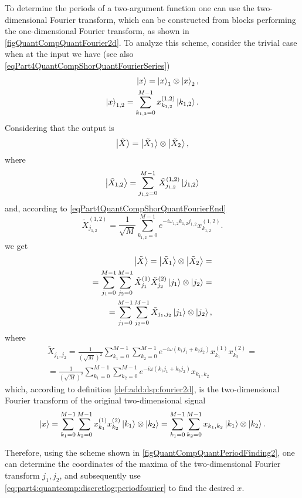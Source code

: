 To determine the periods of a two-argument function one can use
the two-dimensional Fourier transform, which can be constructed from
blocks performing the one-dimensional Fourier transform, as shown in \autoref{figQuantCompQuantFourier2d}. To analyze this
scheme, consider the trivial case when
at the input we have (see also \eqref{eqPart4QuantCompShorQuantFourierSeries})
\begin{eqnarray}
\ket{x} = \ket{x}_1 \otimes \ket{x}_2,
\nonumber \\
\ket{x}_{1,2} = \sum_{k_{1,2} = 0}^{M-1} x_{k_{1,2}}^{(1,2)} \ket{k_{1,2}}.
\nonumber
\end{eqnarray}
Considering that the output is
\[
\ket{\tilde{X}} = \ket{\tilde{X}_1} \otimes \ket{\tilde{X}_2},
\]
where
\[
\ket{\tilde{X}_{1,2}} = \sum_{j_{1,2} = 0}^{M-1} \tilde{X}_{j_{1,2}}^{(1,2)} \ket{j_{1,2}}
\]
and, according to \eqref{eqPart4QuantCompShorQuantFourierEnd}
\[
\tilde{X}_{j_{1,2}}^{(1,2)} = \frac{1}{\sqrt{M}}\sum_{k_{1,2} = 0}^{M - 1}e^{-i \omega_{1,2} k_{1,2} j_{1,2}} x_{k_{1,2}}^{(1,2)}.
\]
we get
\begin{eqnarray}
\ket{\tilde{X}} = \ket{\tilde{X}_1} \otimes \ket{\tilde{X}_2} = 
\nonumber \\
= \sum_{j_1 = 0}^{M-1}\sum_{j_2 = 0}^{M-1}
\tilde{X}_{j_{1}}^{(1)} \tilde{X}_{j_{2}}^{(2)} \ket{j_1} \otimes
\ket{j_2} =
\nonumber \\
= \sum_{j_1 = 0}^{M-1}\sum_{j_2 = 0}^{M-1}
\tilde{X}_{j_{1},j_{2}} \ket{j_1} \otimes
\ket{j_2}, 
\nonumber
\end{eqnarray}
where
\begin{eqnarray}
\tilde{X}_{j_{1},j_{2}} = \frac{1}{\left( \sqrt{M} \right)^2} 
\sum_{k_{1} = 0}^{M - 1}\sum_{k_{2} = 0}^{M - 1}
e^{-i \omega \left( k_{1} j_{1} + k_{2} j_{2}\right)}
x_{k_1}^{(1)}x_{k_2}^{(2)} =
\nonumber \\
= \frac{1}{\left( \sqrt{M} \right)^2}
\sum_{k_{1} = 0}^{M - 1}\sum_{k_{2} = 0}^{M - 1}
e^{-i \omega \left( k_{1} j_{1} + k_{2} j_{2}\right)}
x_{k_1, k_2}
\nonumber
\end{eqnarray}
which, according to definition \ref{def:add:dsp:fourier2d},
is the two-dimensional Fourier transform of the original two-dimensional 
signal
\[
\ket{x} = 
\sum_{k_1 = 0}^{M-1}\sum_{k_2 = 0}^{M-1}
x_{k_1}^{(1)}x_{k_2}^{(2)} \ket{k_1} \otimes \ket{k_2} =
\sum_{k_1 = 0}^{M-1}\sum_{k_2 = 0}^{M-1}
x_{k_1,k_2} \ket{k_1} \otimes \ket{k_2}.  
\]



Therefore, using the scheme shown in
\autoref{figQuantCompQuantPeriodFinding2}, one can determine the coordinates
of the maxima of the two-dimensional Fourier transform $j_1, j_2$, and subsequently use
\eqref{eq:part4:quantcomp:discretlog:periodfourier} to find the desired $x$.
